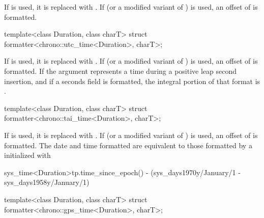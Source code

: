 \begin{itemdescr}
\pnum
\remarks
If  is used,
it is replaced with .
If  (or a modified variant of ) is used,
an offset of  is formatted.
\end{itemdescr}

%
\begin{itemdecl}
template<class Duration, class charT>
  struct formatter<chrono::utc_time<Duration>, charT>;
\end{itemdecl}

\begin{itemdescr}
\pnum
\remarks
If  is used,
it is replaced with .
If  (or a modified variant of ) is used,
an offset of  is formatted.
If the argument represents a time during a positive leap second insertion,
and if a seconds field is formatted,
the integral portion of that format is
.
\end{itemdescr}

%
\begin{itemdecl}
template<class Duration, class charT>
  struct formatter<chrono::tai_time<Duration>, charT>;
\end{itemdecl}

\begin{itemdescr}
\pnum
\remarks
If  is used,
it is replaced with .
If  (or a modified variant of ) is used,
an offset of  is formatted.
The date and time formatted are equivalent to
those formatted by a  initialized with
\begin{codeblock}
sys_time<Duration>{tp.time_since_epoch()} -
  (sys_days{1970y/January/1} - sys_days{1958y/January/1})
\end{codeblock}
\end{itemdescr}

%
\begin{itemdecl}
template<class Duration, class charT>
  struct formatter<chrono::gps_time<Duration>, charT>;
\end{itemdecl}

